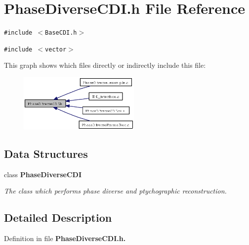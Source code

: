 \section{Phase\-Diverse\-CDI.h File Reference}
\label{PhaseDiverseCDI_8h}
{\tt \#include $<$Base\-CDI.h$>$}\par
{\tt \#include $<$vector$>$}\par


This graph shows which files directly or indirectly include this file:\begin{figure}[H]
\begin{center}
\leavevmode
\includegraphics[width=167pt]{PhaseDiverseCDI_8h__dep__incl}
\end{center}
\end{figure}
\subsection*{Data Structures}
\begin{CompactItemize}
\item 
class \bf{Phase\-Diverse\-CDI}
\begin{CompactList}\small\item\em The class which performs phase diverse and ptychographic reconstruction. \item\end{CompactList}\end{CompactItemize}


\subsection{Detailed Description}


Definition in file \bf{Phase\-Diverse\-CDI.h}.